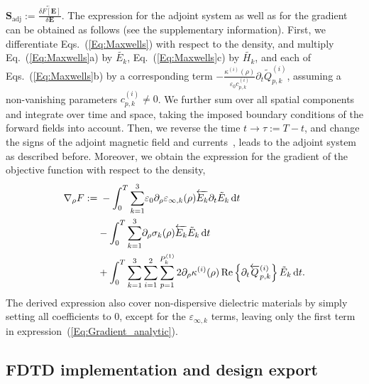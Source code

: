 \documentclass[aps,prl,twocolumn,superscriptaddress,longbibliography]{revtex4-1}
\begin{document}
$\mathbf{S}_{\mathrm{adj}}:=\overleftarrow{\frac{\delta F[\mathbf{E}]}{\delta \mathbf{E}}}.$
The expression for the adjoint system as well as for the gradient can be obtained as follows (see the supplementary information). First,  we differentiate Eqs.~(\ref{Eq:Maxwells}) with respect to the density, and multiply Eq.~(\ref{Eq:Maxwells}a) by $\tilde{E_k}$, Eq.~(\ref{Eq:Maxwells}c) by $\tilde{H_k}$, and each of Eqs.~(\ref{Eq:Maxwells}b) by a corresponding term $-\frac{\kappa^{(i)}(\rho)}{\varepsilon_{0} c_{p, k}^{(i)}}\partial_{t}\tilde{Q}_{p, k}^{(i)}$, assuming a non-vanishing parameters $c_{p, k}^{(i)} \neq 0$. We further sum over all spatial components and integrate over time and space, taking the imposed boundary conditions of the forward fields into account. 
Then, we reverse the time $t \rightarrow \tau:= T-t$, and change the signs of the adjoint magnetic field and currents~\cite{Hassan15Time}, leads to the adjoint system as described before.
Moreover, we obtain the expression for the gradient of the objective function with respect to the density,
\begin{equation}\label{Eq:Gradient_analytic}
\begin{split}
\nabla_{\rho}F:=&\;-\int_{0}^{T}{ \sum_{k=1}^{3}}\varepsilon_{0}\partial_{\rho}\varepsilon_{\infty, k}(\rho) \overleftarrow{E_{k}}\partial_{t}\Tilde{E}_{k}\,\mathrm{d}t \\
 &-\int_{0}^{T} { \sum_{k=1}^{3}}\partial_{\rho}\sigma_{k}(\rho)\overleftarrow{E_{k}}\Tilde{E}_{k}\,\mathrm{d}t \\
 &+\int_{0}^{T}{ \sum_{k=1}^{3}}\sum^{2}_{i=1}\sum_{p=1}^{P_{k}^{(1)}}2\partial_{\rho}\kappa^{(i)}(\rho)\Re\left\{\partial_{t}\overleftarrow{Q}_{p, k}^{(i)}\right\}\Tilde{E}_{k}\,\mathrm{d}t.
\end{split}
\end{equation}
The derived expression also cover non-dispersive dielectric materials by simply setting all coefficients to 0, except for the $\varepsilon_{\infty,k}$ terms, leaving only the first term in expression~(\ref{Eq:Gradient_analytic}).
\subsection{FDTD implementation and design export}\label{Sec:FDTD}
\end{document}
